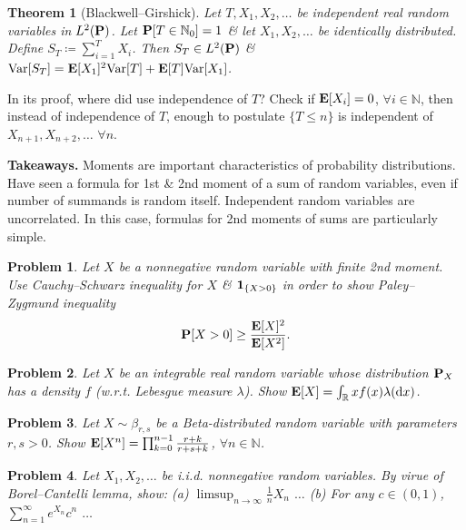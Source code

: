 \documentclass{article}
\newtheorem{problem}{Problem}
\newtheorem{theorem}{Theorem}
\begin{document}
\begin{enumerate}
\begin{itemize}
\begin{itemize}
			\begin{theorem}[Blackwell--Girshick]
				Let $T,X_1,X_2,\ldots$ be independent real random variables in $L^2({\bf P})$. Let ${\bf P}[T\in\mathbb{N}_0] = 1$ \& let $X_1,X_2,\ldots$ be identically distributed. Define $S_T\coloneqq\sum_{i=1}^T X_i$. Then $S_T\in L^2({\bf P})$ \& ${\rm Var}[S_T] = {\bf E}[X_1]^2{\rm Var}[T] + {\bf E}[T]{\rm Var}[X_1]$.
			\end{theorem}
			In its proof, where did use independence of $T$? Check if ${\bf E}[X_i] = 0$, $\forall i\in\mathbb{N}$, then instead of independence of $T$, enough to postulate $\{T\le n\}$ is independent of $X_{n+1},X_{n+2},\ldots$ $\forall n$.
			
			{\bf Takeaways.} Moments are important characteristics of probability distributions. Have seen a formula for 1st \& 2nd moment of a sum of random variables, even if number of summands is random itself. Independent random variables are uncorrelated. In this case, formulas for 2nd moments of sums are particularly simple.
			
			\begin{problem}
				Let $X$ be a nonnegative random variable with finite 2nd moment. Use Cauchy--Schwarz inequality for $X$ \& ${\bf 1}_{\{X > 0\}}$ in order to show Paley--Zygmund inequality
				\begin{equation}
					{\bf P}[X > 0]\ge\frac{{\bf E}[X]^2}{{\bf E}[X^2]}.
				\end{equation}
			\end{problem}
			
			\begin{problem}
				Let $X$ be an integrable real random variable whose distribution ${\bf P}_X$ has a density $f$ (w.r.t. Lebesgue measure $\lambda$). Show ${\bf E}[X] = \int_\mathbb{R} xf(x)\lambda({\rm d}x)$.
			\end{problem}
			
			\begin{problem}
				Let $X\sim\beta_{r,s}$ be a Beta-distributed random variable with parameters $r,s > 0$. Show ${\bf E}[X^n] = \prod_{k=0}^{n-1} \frac{r + k}{r + s + k}$, $\forall n\in\mathbb{N}$.
			\end{problem}
			
			\begin{problem}
				Let $X_1,X_2,\ldots$ be i.i.d. nonnegative random variables. By virue of Borel--Cantelli lemma, show: (a) $\limsup_{n\to\infty} \frac{1}{n}X_n$ $\ldots$ (b) For any $c\in(0,1)$, $\sum_{n=1}^\infty e^{X_n}c^n$ $\ldots$
			\end{problem}
			

\end{itemize}
\end{itemize}
\end{enumerate}
\end{document}
